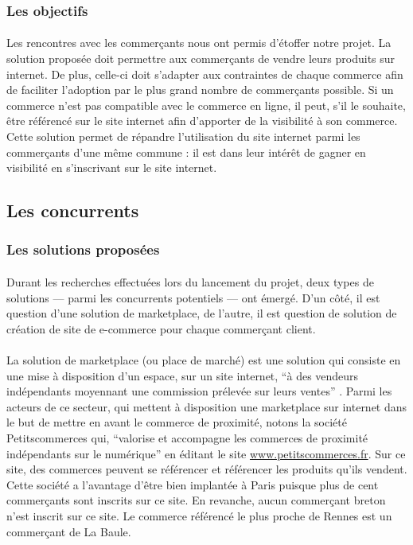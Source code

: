\documentclass[a4paper, 12pt]{article}
\begin{document}
\subsubsection{Les objectifs}

\paragraph{}Les rencontres avec les commerçants nous ont permis d’étoffer notre projet. La solution proposée doit permettre aux commerçants de vendre leurs produits sur internet. De plus, celle-ci doit s’adapter aux contraintes de chaque commerce afin de faciliter l’adoption par le plus grand nombre de commerçants possible. Si un commerce n’est pas compatible avec le commerce en ligne, il peut, s’il le souhaite, être référencé sur le site internet afin d'apporter de la visibilité à son commerce. Cette solution permet de répandre l’utilisation du site internet parmi les commerçants d’une même commune : il est dans leur intérêt de gagner en visibilité en s’inscrivant sur le site internet.

\subsection{Les concurrents}
\subsubsection{Les solutions proposées}

\paragraph{}Durant les recherches effectuées lors du lancement du projet, deux types de solutions — parmi les concurrents potentiels — ont émergé. D’un côté, il est question d’une solution de marketplace, de l’autre, il est question de solution de création de site de e-commerce pour chaque commerçant client.
\paragraph{}La solution de marketplace (ou place de marché) est une solution qui consiste en une mise à disposition d’un espace, sur un site internet, “à des vendeurs indépendants moyennant une commission prélevée sur leurs ventes” \cite{def_marketplace}.  Parmi les acteurs de ce secteur, qui mettent à disposition une marketplace sur internet dans le but de mettre en avant le commerce de proximité, notons la société Petitscommerces \cite{petitscommerces} qui, “valorise et accompagne les commerces de proximité indépendants sur le numérique” en éditant le site \url{www.petitscommerces.fr}. Sur ce site, des commerces peuvent se référencer et référencer les produits qu’ils vendent. Cette société a l’avantage d’être bien implantée à Paris puisque plus de cent commerçants sont inscrits sur ce site. En revanche, aucun commerçant breton n’est inscrit sur ce site. Le commerce référencé le plus proche de Rennes est un commerçant de La Baule.
\end{document}
